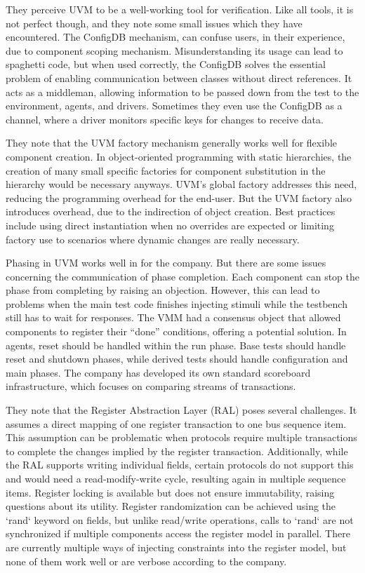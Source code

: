 \documentclass[12pt]{book}
\begin{document}
They perceive UVM to be a well-working tool for verification. Like all tools, it is not perfect though, and they note some small issues which they have encountered. The ConfigDB mechanism, can confuse users, in their experience, due to component scoping mechanism. Misunderstanding its usage can lead to spaghetti code, but when used correctly, the ConfigDB solves the essential problem of enabling communication between classes without direct references. It acts as a middleman, allowing information to be passed down from the test to the environment, agents, and drivers. Sometimes they even use the ConfigDB as a channel, where a driver monitors specific keys for changes to receive data.

They note that the UVM factory mechanism generally works well for flexible component creation. In object-oriented programming with static hierarchies, the creation of many small specific factories for component substitution in the hierarchy would be necessary anyways. UVM's global factory addresses this need, reducing the programming overhead for the end-user. But the UVM factory also introduces overhead, due to the indirection of object creation. Best practices include using direct instantiation when no overrides are expected or limiting factory use to scenarios where dynamic changes are really necessary.

Phasing in UVM works well in for the company. But there are some issues concerning the communication of phase completion. Each component can stop the phase from completing by raising an objection. However, this can lead to problems when the main test code finishes injecting stimuli while the testbench still has to wait for responses. The VMM had a consensus object that allowed components to register their “done” conditions, offering a potential solution. In agents, reset should be handled within the run phase. Base tests should handle reset and shutdown phases, while derived tests should handle configuration and main phases. The company has developed its own standard scoreboard infrastructure, which focuses on comparing streams of transactions.

They note that the Register Abstraction Layer (RAL) poses several challenges. It assumes a direct mapping of one register transaction to one bus sequence item. This assumption can be problematic when protocols require multiple transactions to complete the changes implied by the register transaction. Additionally, while the RAL supports writing individual fields, certain protocols do not support this and would need a read-modify-write cycle, resulting again in multiple sequence items. Register locking is available but does not ensure immutability, raising questions about its utility. Register randomization can be achieved using the `rand` keyword on fields, but unlike read/write operations, calls to `rand` are not synchronized if multiple components access the register model in parallel. There are currently multiple ways of injecting constraints into the register model, but none of them work well or are verbose according to the company. 
\end{document}
